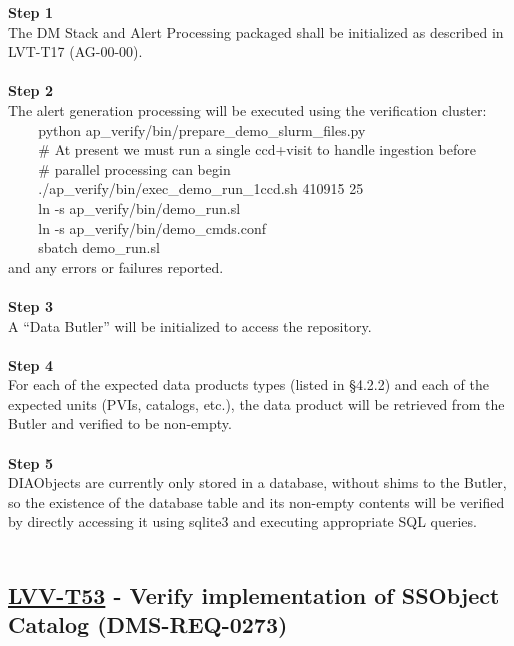 \textbf{Step 1}\\
The DM Stack and Alert Processing packaged shall be initialized as
described in LVT-T17 (AG-00-00).\\
~\\
\textbf{Step 2}\\
The alert generation processing will be executed using the verification
cluster:\\
\hspace*{0.333em} ~ ~ ~python
ap\_verify/bin/prepare\_demo\_slurm\_files.py\\
\hspace*{0.333em} ~ ~ ~\# At present we must run a single ccd+visit to
handle ingestion before\\
\hspace*{0.333em} ~ ~ ~\# parallel processing can begin\\
\hspace*{0.333em} ~ ~ ~./ap\_verify/bin/exec\_demo\_run\_1ccd.sh 410915
25\\
\hspace*{0.333em} ~ ~ ~ln -s ap\_verify/bin/demo\_run.sl\\
\hspace*{0.333em} ~ ~ ~ln -s ap\_verify/bin/demo\_cmds.conf\\
\hspace*{0.333em} ~ ~ ~sbatch demo\_run.sl\\
and any errors or failures reported.\\
~\\
\textbf{Step 3}\\
A ``Data Butler'' will be initialized to access the repository.\\
~\\
\textbf{Step 4}\\
For each of the expected data products types (listed in §4.2.2) and each
of the expected units (PVIs, catalogs, etc.), the data product will be
retrieved from the Butler and verified to be non-empty.\\
~\\
\textbf{Step 5}\\
DIAObjects are currently only stored in a database, without shims to the
Butler, so the existence of the database table and its non-empty
contents will be verified by directly accessing it using sqlite3 and
executing appropriate SQL queries.\\
~\\

\hypertarget{lvv-t53---verify-implementation-of-ssobject-catalog-dms-req-0273}{%
\subsection{\texorpdfstring{\href{https://jira.lsstcorp.org/secure/Tests.jspa\#/testCase/LVV-T53}{LVV-T53}
- Verify implementation of SSObject Catalog
(DMS-REQ-0273)}{LVV-T53 - Verify implementation of SSObject Catalog (DMS-REQ-0273)}}\label{lvv-t53---verify-implementation-of-ssobject-catalog-dms-req-0273}}


